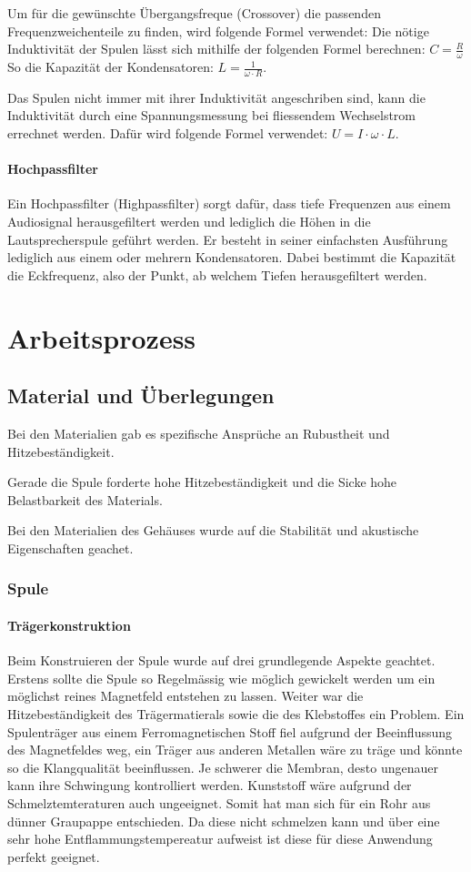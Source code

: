 \documentclass[a4paper,11pt]{report}
\begin{document}
Um für die gewünschte Übergangsfreque (Crossover) die passenden Frequenzweichenteile zu finden, wird folgende Formel verwendet:
Die nötige Induktivität der Spulen lässt sich mithilfe der folgenden Formel berechnen: $C = \frac{R}{\omega}$ 
So die Kapazität der Kondensatoren: $L = \frac{1}{\omega \cdot R}$.

Das Spulen nicht immer mit ihrer Induktivität angeschriben sind, kann die Induktivität durch eine Spannungsmessung bei fliessendem Wechselstrom errechnet werden. Dafür wird folgende Formel verwendet: $U = I \cdot \omega \cdot L$.

\subsubsection*{Hochpassfilter}
Ein Hochpassfilter (Highpassfilter) sorgt dafür, dass tiefe Frequenzen aus einem Audiosignal herausgefiltert werden und lediglich die Höhen in die Lautsprecherspule geführt werden. Er besteht in seiner einfachsten Ausführung lediglich aus einem oder mehrern Kondensatoren. Dabei bestimmt die Kapazität die Eckfrequenz, also der Punkt, ab welchem Tiefen herausgefiltert werden.

\chapter{Arbeitsprozess}
\section{Material und Überlegungen}
Bei den Materialien gab es spezifische Ansprüche an Rubustheit und Hitzebeständigkeit.

Gerade die Spule forderte hohe Hitzebeständigkeit und die Sicke hohe Belastbarkeit des Materials.

Bei den Materialien des Gehäuses wurde auf die Stabilität und akustische Eigenschaften geachet.

\subsection{Spule}
\subsubsection*{Trägerkonstruktion}

Beim Konstruieren der Spule wurde auf drei grundlegende Aspekte geachtet. Erstens sollte die Spule so Regelmässig wie möglich gewickelt werden um ein möglichst reines Magnetfeld entstehen zu lassen. Weiter war die Hitzebeständigkeit des Trägermatierals sowie die des Klebstoffes ein Problem. Ein Spulenträger aus einem Ferromagnetischen Stoff fiel aufgrund der Beeinflussung des Magnetfeldes weg, ein Träger aus anderen Metallen wäre zu träge und könnte so die Klangqualität beeinflussen. Je schwerer die Membran, desto ungenauer kann ihre Schwingung kontrolliert werden. Kunststoff wäre aufgrund der Schmelztemteraturen auch ungeeignet. Somit hat man sich für ein Rohr aus dünner Graupappe entschieden. Da diese nicht schmelzen kann und über eine sehr hohe Entflammungstempereatur aufweist ist diese für diese Anwendung perfekt geeignet. 
\end{document}
